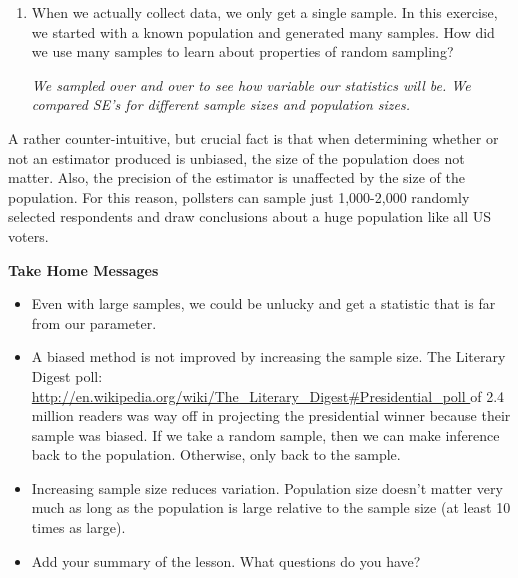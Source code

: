 \begin{enumerate}
     \item When we actually collect data, we only get a single sample.
       In this exercise, we started with a known population and
       generated many samples. How did we use many samples to learn
       about properties of random sampling?
\begin{students}
  \vspace{1.5in}
\end{students}    
\begin{key}
   {\it  We sampled over and over to see how variable our statistics
     will be.  We compared SE's for different sample sizes and
     population sizes. }
\end{key}

  \end{enumerate}

  A rather counter-intuitive, but  crucial fact is that when
  determining whether or not an estimator produced is unbiased, the
  size of the population does not matter. Also, the precision of the
  estimator is unaffected by the size of the population. For this
  reason, pollsters can  sample just 1,000-2,000 randomly selected
  respondents and draw conclusions about a huge population like all US
  voters. 

  \begin{center}
    {\bf Take Home Messages}
  \end{center}
 
  \begin{itemize}
  \item Even with large samples, we could be unlucky and get a
    statistic that is far from our parameter.
  \item A biased method is not improved by increasing the sample size.
    The Literary Digest poll:\\
    \url{http://en.wikipedia.org/wiki/The_Literary_Digest#Presidential_poll
    } of 2.4 million
    readers was way off in projecting the presidential winner because
    their sample was biased.
    If we take a random sample, then we can make inference back to the
    population. Otherwise, only back to the sample.

  \item Increasing sample size reduces variation.  Population size
    doesn't matter very  much as long as the population is large
    relative to the sample size (at least 10 times as large).
  \item Add your summary of the lesson.  What questions do you have?
  \end{itemize}\vspace{\fill}


